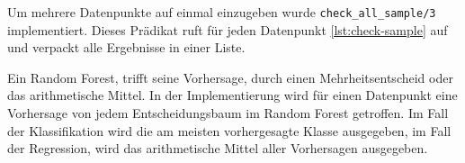 Um mehrere Datenpunkte auf einmal einzugeben wurde \texttt{check\_all\_sample/3}
implementiert. Dieses Prädikat ruft für jeden Datenpunkt \cref{lst:check-sample} auf
und verpackt alle Ergebnisse in einer Liste.

Ein Random Forest, trifft seine Vorhersage, durch einen Mehrheitsentscheid oder das arithmetische Mittel.
In der Implementierung wird für einen Datenpunkt eine Vorhersage von jedem Entscheidungsbaum im 
Random Forest getroffen.
Im Fall der Klassifikation wird die am meisten vorhergesagte Klasse ausgegeben, im Fall der Regression,
wird das arithmetische Mittel aller Vorhersagen ausgegeben.